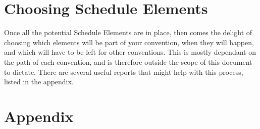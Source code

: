 \documentclass[captions=tablesignature]{scrartcl}
\begin{document}
\section{Choosing Schedule Elements}
\label{sec-6}

Once all the potential Schedule Elements are in place, then comes
the delight of choosing which elements will be part of your
convention, when they will happen, and which will have to be
left for other conventions.  This is mostly dependant on the path of
each convention, and is therefore outside the scope of this document
to dictate.  There are several useful reports that might help with
this process, listed in the appendix.

\newpage
\appendix
{}

\section{Appendix}
\label{sec-7}
\end{document}
